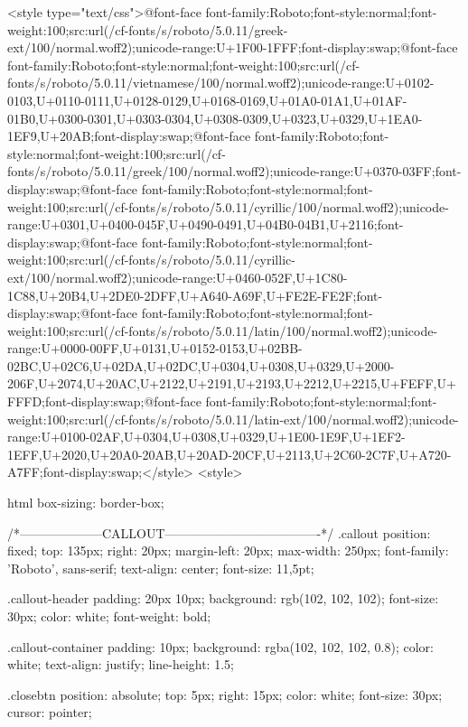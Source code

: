 <style type="text/css">@font-face {font-family:Roboto;font-style:normal;font-weight:100;src:url(/cf-fonts/s/roboto/5.0.11/greek-ext/100/normal.woff2);unicode-range:U+1F00-1FFF;font-display:swap;}@font-face {font-family:Roboto;font-style:normal;font-weight:100;src:url(/cf-fonts/s/roboto/5.0.11/vietnamese/100/normal.woff2);unicode-range:U+0102-0103,U+0110-0111,U+0128-0129,U+0168-0169,U+01A0-01A1,U+01AF-01B0,U+0300-0301,U+0303-0304,U+0308-0309,U+0323,U+0329,U+1EA0-1EF9,U+20AB;font-display:swap;}@font-face {font-family:Roboto;font-style:normal;font-weight:100;src:url(/cf-fonts/s/roboto/5.0.11/greek/100/normal.woff2);unicode-range:U+0370-03FF;font-display:swap;}@font-face {font-family:Roboto;font-style:normal;font-weight:100;src:url(/cf-fonts/s/roboto/5.0.11/cyrillic/100/normal.woff2);unicode-range:U+0301,U+0400-045F,U+0490-0491,U+04B0-04B1,U+2116;font-display:swap;}@font-face {font-family:Roboto;font-style:normal;font-weight:100;src:url(/cf-fonts/s/roboto/5.0.11/cyrillic-ext/100/normal.woff2);unicode-range:U+0460-052F,U+1C80-1C88,U+20B4,U+2DE0-2DFF,U+A640-A69F,U+FE2E-FE2F;font-display:swap;}@font-face {font-family:Roboto;font-style:normal;font-weight:100;src:url(/cf-fonts/s/roboto/5.0.11/latin/100/normal.woff2);unicode-range:U+0000-00FF,U+0131,U+0152-0153,U+02BB-02BC,U+02C6,U+02DA,U+02DC,U+0304,U+0308,U+0329,U+2000-206F,U+2074,U+20AC,U+2122,U+2191,U+2193,U+2212,U+2215,U+FEFF,U+FFFD;font-display:swap;}@font-face {font-family:Roboto;font-style:normal;font-weight:100;src:url(/cf-fonts/s/roboto/5.0.11/latin-ext/100/normal.woff2);unicode-range:U+0100-02AF,U+0304,U+0308,U+0329,U+1E00-1E9F,U+1EF2-1EFF,U+2020,U+20A0-20AB,U+20AD-20CF,U+2113,U+2C60-2C7F,U+A720-A7FF;font-display:swap;}</style>
<style>


html {
  box-sizing: border-box;
}

/*--------------------CALLOUT-------------------------------------*/
.callout {
  position: fixed;
  top: 135px;
  right: 20px;
  margin-left: 20px;
  max-width: 250px;
  font-family: 'Roboto', sans-serif;
  text-align: center;
  font-size: 11,5pt;
}

.callout-header {
  padding: 20px 10px;
  background: rgb(102, 102, 102);
  font-size: 30px;
  color: white;
  font-weight: bold;
}

.callout-container {
  padding: 10px;
  background: rgba(102, 102, 102, 0.8);
  color: white;
  text-align: justify;
  line-height: 1.5;
}

.closebtn {
  position: absolute;
  top: 5px;
  right: 15px;
  color: white;
  font-size: 30px;
  cursor: pointer;
}

